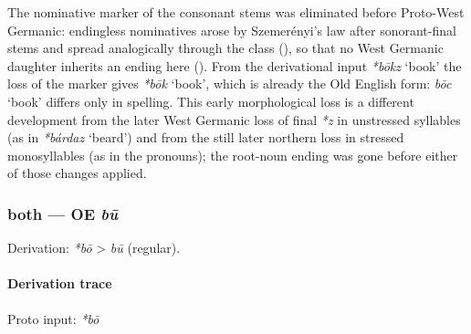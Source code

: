 \documentclass[
  british,
  a4paper,
]{article}
\providecommand{\Recon}[1]{\emph{*#1}}
\begin{document}
The nominative marker of the consonant stems was eliminated before
Proto-West Germanic: endingless nominatives arose by Szemerényi's law
after sonorant-final stems and spread analogically through the class
(), so that no West Germanic
daughter inherits an ending here (). From the derivational input \Recon{bōkz} `book'
the loss of the marker gives \Recon{bōk} `book', which is already the
Old English form: \emph{bōc} `book' differs only in spelling. This early
morphological loss is a different development from the later West
Germanic loss of final \emph{*z} in unstressed syllables (as in
\Recon{bárdaz} `beard') and from the still later northern loss in
stressed monosyllables (as in the pronouns); the root-noun ending was
gone before either of those changes applied.

\subsubsection{\texorpdfstring{both --- OE
\emph{bū}}{both --- OE bū}}\label{both-oe-bux16b}

Derivation: \emph{*bō} \textgreater{} \emph{bū} (regular).

\paragraph{Derivation trace}\label{derivation-trace-8}

Proto input: \emph{*bō}

\begingroup
\setlength{\fboxsep}{6pt}
\end{document}
